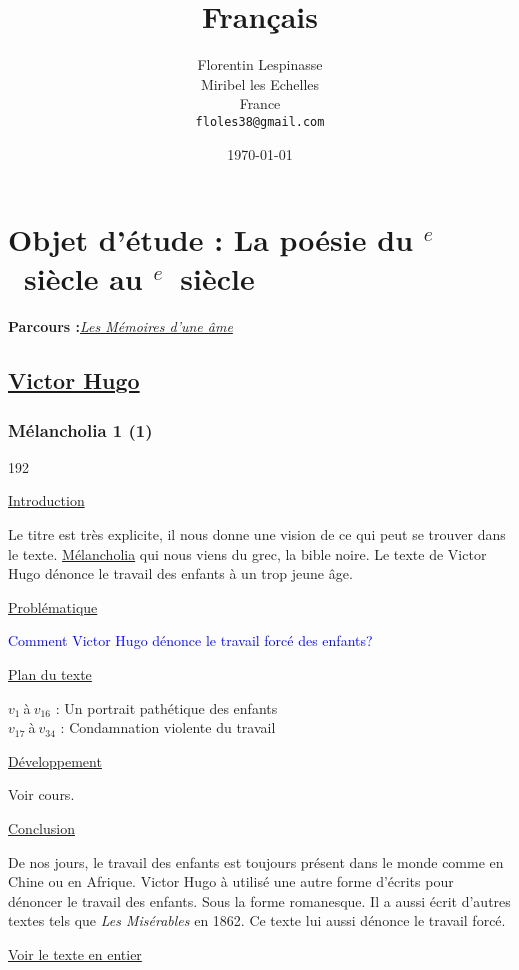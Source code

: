 \documentclass[12pt,a4paper]{article}
\title{Fran\c cais}
\author{Florentin Lespinasse\\
	Miribel les Echelles\\
	France\\
	   \texttt{floles38@gmail.com}}
\date{\today}
\begin{document}
\begin{center}
\setcounter{tocdepth}{4}								%
\renewcommand{\contentsname}{Sommaire}					%
\newpage
\tableofcontents										%
\end{center}
\newpage
		\section[Les M\'emoires d'une \^ame]{Objet d'\'etude : La po\'esie du \textsc{}$^{e}$~siècle au \textsc{}$^{e}$~siècle}
		\textbf{Parcours :}\textit{\underline{Les M\'emoires d'une \^ame}}
			\subsection{\href{.extra/Bio/Hugo.pdf}{Victor Hugo}}
				\subsubsection{M\'elancholia 1 (1) }
\begin{dingautolist}{192}

\item \underline{Introduction} \par
Le titre est très explicite, il nous donne une vision de ce qui peut se trouver dans le texte. 
\underline{Mélancholia} qui nous viens du grec, la bible noire.
Le texte de Victor Hugo dénonce le travail des enfants à un trop jeune âge.

\item \underline{Probl\'ematique }\par
	\textcolor{blue}{Comment Victor Hugo d\'enonce le travail forc\'e des enfants?}
\item \underline{Plan du texte} \par
		$v_{1}~$\`a$~v_{16}$ : Un portrait path\'etique des enfants\\
        $v_{17}~$\`a$~v_{34}$ : Condamnation violente du travail 
	

\item \underline{D\'eveloppement} \par
	Voir cours.

\item \underline{Conclusion} \par
	De nos jours, le travail des enfants est toujours pr\'esent dans le monde comme en Chine ou en Afrique. Victor Hugo \`a utilis\'e une autre forme d'\'ecrits pour d\'enoncer le travail des enfants. Sous la forme romanesque. Il a aussi \'ecrit d'autres textes tels que \textit{Les Mis\'erables} en 1862. Ce texte lui aussi d\'enonce le travail forc\'e.
\end{dingautolist}
\href{.extra/Textes/Melancholia.pdf}{Voir le texte en entier}
 \newpage
\end{document}
